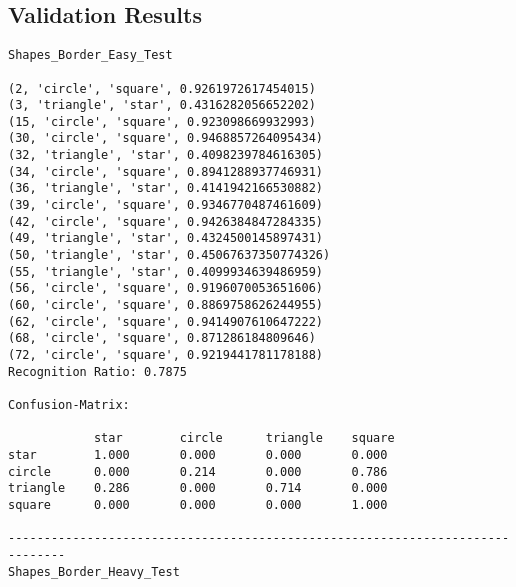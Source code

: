 \documentclass[a4paper, 10pt]{article}
\begin{document}
	\subsection{Validation Results}
	
	\begin{verbatim}Shapes_Border_Easy_Test

(2, 'circle', 'square', 0.9261972617454015)
(3, 'triangle', 'star', 0.4316282056652202)
(15, 'circle', 'square', 0.923098669932993)
(30, 'circle', 'square', 0.9468857264095434)
(32, 'triangle', 'star', 0.4098239784616305)
(34, 'circle', 'square', 0.8941288937746931)
(36, 'triangle', 'star', 0.4141942166530882)
(39, 'circle', 'square', 0.9346770487461609)
(42, 'circle', 'square', 0.9426384847284335)
(49, 'triangle', 'star', 0.4324500145897431)
(50, 'triangle', 'star', 0.45067637350774326)
(55, 'triangle', 'star', 0.4099934639486959)
(56, 'circle', 'square', 0.9196070053651606)
(60, 'circle', 'square', 0.8869758626244955)
(62, 'circle', 'square', 0.9414907610647222)
(68, 'circle', 'square', 0.871286184809646)
(72, 'circle', 'square', 0.9219441781178188)
Recognition Ratio: 0.7875

Confusion-Matrix:

            star        circle      triangle    square      
star        1.000       0.000       0.000       0.000       
circle      0.000       0.214       0.000       0.786       
triangle    0.286       0.000       0.714       0.000       
square      0.000       0.000       0.000       1.000       

------------------------------------------------------------------------------
Shapes_Border_Heavy_Test


\end{verbatim}
\end{document}
